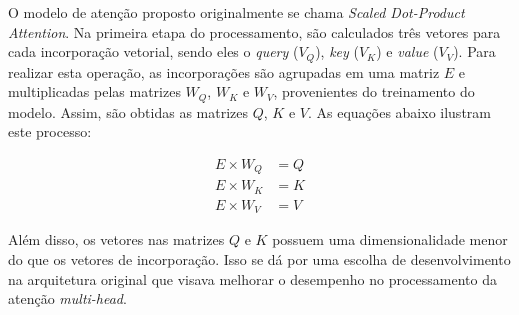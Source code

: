O modelo de atenção proposto originalmente se chama \textit{Scaled Dot-Product Attention}. Na primeira etapa do
processamento, são calculados três vetores para cada incorporação vetorial, sendo eles o \textit{query}
(\begin{math}V_Q\end{math}), \textit{key} (\begin{math}V_K\end{math}) e \textit{value} (\begin{math}V_V\end{math}).
Para realizar esta operação, as incorporações são agrupadas em uma matriz \begin{math}E\end{math} e multiplicadas pelas
matrizes \begin{math}W_Q\end{math},
\begin{math}W_K\end{math} e \begin{math}W_V\end{math}, provenientes do treinamento do modelo. Assim, são obtidas as
matrizes \begin{math}Q\end{math},
\begin{math}K\end{math} e \begin{math}V\end{math}. As equações abaixo ilustram este processo:

\begin{align*}
    E \times W_Q & = Q \\
    E \times W_K & = K \\
    E \times W_V & = V
\end{align*}

Além disso, os vetores nas matrizes \begin{math}Q\end{math} e \begin{math}K\end{math} possuem uma dimensionalidade
menor do que os vetores de incorporação. Isso se dá
por uma escolha de desenvolvimento na arquitetura original que visava melhorar o desempenho no processamento da atenção
\textit{multi-head}.


